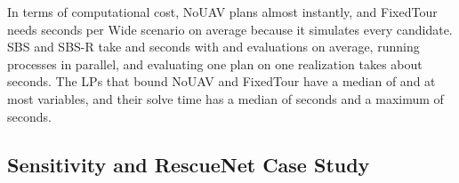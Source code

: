 \label{sec:results-runtime}
In terms of computational cost, NoUAV plans almost instantly, and FixedTour needs \ResultPlanningVzeroBone{} seconds per Wide scenario on average because it simulates every candidate. SBS and SBS-R take \ResultTwoPlanningVzeroBtwo{} and \ResultTwoPlanningVzeroP{} seconds with \ResultTwoCallsVzeroBtwo{} and \ResultTwoCallsVzeroP{} evaluations on average, running \ResultWorkers{} processes in parallel, and evaluating one plan on one realization takes about \ResultEvaluationVzeroBone{} seconds. The \ResultLpCount{} LPs that bound NoUAV and FixedTour have a median of \ResultLpVariablesMedian{} and at most \ResultLpVariablesMax{} variables, and their solve time has a median of \ResultLpRuntimeMedian{} seconds and a maximum of \ResultLpRuntimeMax{} seconds.

\subsection{Sensitivity and RescueNet Case Study}
\label{sec:results-sensitivity}
